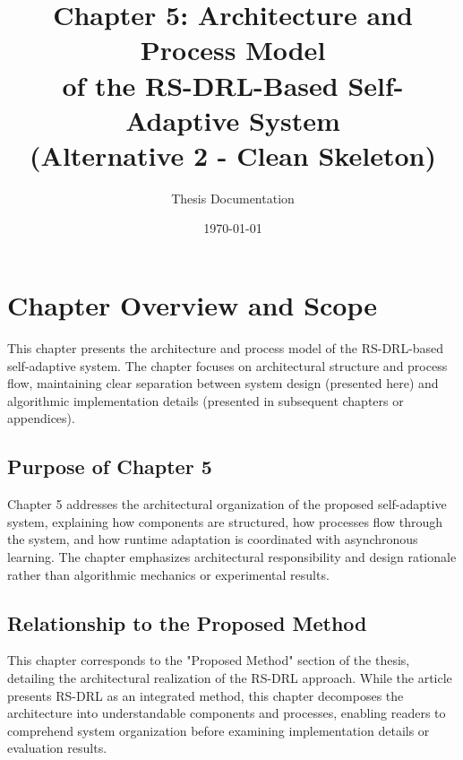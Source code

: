 \documentclass[11pt,a4paper]{article}
\title{Chapter 5: Architecture and Process Model\\of the RS-DRL-Based Self-Adaptive System\\(Alternative 2 - Clean Skeleton)}
\author{Thesis Documentation}
\date{\today}
\begin{document}
\maketitle

\tableofcontents
\newpage

\setcounter{section}{0}
\renewcommand{\thesection}{5.\arabic{section}}
\renewcommand{\thesubsection}{5.\arabic{section}.\arabic{subsection}}
\renewcommand{\thesubsubsection}{5.\arabic{section}.\arabic{subsection}.\arabic{subsubsection}}


\section{Chapter Overview and Scope}
\label{sec:overview}

This chapter presents the architecture and process model of the RS-DRL-based self-adaptive system. The chapter focuses on architectural structure and process flow, maintaining clear separation between system design (presented here) and algorithmic implementation details (presented in subsequent chapters or appendices).

\subsection{Purpose of Chapter 5}

Chapter 5 addresses the architectural organization of the proposed self-adaptive system, explaining how components are structured, how processes flow through the system, and how runtime adaptation is coordinated with asynchronous learning. The chapter emphasizes architectural responsibility and design rationale rather than algorithmic mechanics or experimental results.

\subsection{Relationship to the Proposed Method}

This chapter corresponds to the "Proposed Method" section of the thesis, detailing the architectural realization of the RS-DRL approach. While the article presents RS-DRL as an integrated method, this chapter decomposes the architecture into understandable components and processes, enabling readers to comprehend system organization before examining implementation details or evaluation results.
\end{document}

